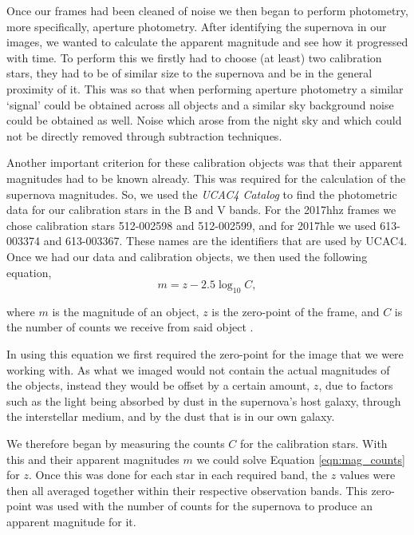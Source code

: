\documentclass[twocolumn]{revtex4}
\begin{document}
Once our frames had been cleaned of noise we then began to perform photometry, more specifically, aperture photometry. After identifying the supernova in our images, we wanted to calculate the apparent magnitude and see how it progressed with time. To perform this we firstly had to choose (at least) two calibration stars, they had to be of similar size to the supernova and be in the general proximity of it.  This was so that when performing aperture photometry a similar `signal' could be obtained across all objects and a similar sky background noise could be obtained as well. Noise which arose from the night sky and which could not be directly removed through subtraction techniques.

Another important criterion for these calibration objects was that their apparent magnitudes had to be known already. This was required for the calculation of the supernova magnitudes. So, we used the \textit{UCAC4 Catalog} to find the photometric data for our calibration stars in the B and V bands. For the 2017hhz frames we chose calibration stars 512-002598 and 512-002599, and for 2017hle we used 613-003374 and 613-003367. These names are the identifiers that are used by UCAC4. Once we had our data and calibration objects, we then used the following equation, 
\begin{equation}
    m = z - 2.5 \log_{10}{C},
\label{eqn:mag_counts}
\end{equation}

where $m$ is the magnitude of an object, $z$ is the zero-point of the frame, and $C$ is the number of counts we receive from said object \cite{astro_image_processing}.

In using this equation we first required the zero-point for the image that we were working with. As what we imaged would not contain the actual magnitudes of the objects, instead they would be offset by a certain amount, $z$, due to factors such as the light being absorbed by dust in the supernova's host galaxy, through the interstellar medium, and by the dust that is in our own galaxy.

We therefore began by measuring the counts $C$ for the calibration stars. With this and their apparent magnitudes $m$ we could solve Equation \ref{eqn:mag_counts} for $z$. Once this was done for each star in each required band, the $z$ values were then all averaged together within their respective observation bands. This zero-point was used with the number of counts for the supernova to produce an apparent magnitude for it.
\end{document}
